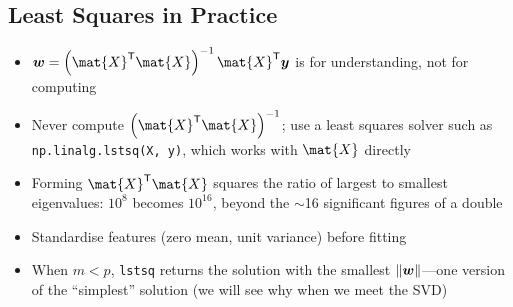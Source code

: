 
\begin{slide}
\section[-1]{Least Squares in Practice}

\begin{PauseHighLight}
  \begin{itemize}
  \item $\bm{w} = \left(\mat{X}^\tr\mat{X}\right)^{-1} \mat{X}^\tr
    \bm{y}$ is for understanding, not for computing\pause
  \item Never compute $\left(\mat{X}^\tr\mat{X}\right)^{-1}$; use a
    least squares solver such as \texttt{np.linalg.lstsq(X, y)}, which
    works with $\mat{X}$ directly\pause
  \item Forming $\mat{X}^\tr\mat{X}$ squares the ratio of largest to
    smallest eigenvalues: $10^8$ becomes $10^{16}$, beyond the
    $\sim$16 significant figures of a double\pause
  \item Standardise features (zero mean, unit variance) before
    fitting\pause
  \item When $m<p$, \texttt{lstsq} returns the solution with the
    smallest $\| \bm{w} \|$---one version of the ``simplest''
    solution (we will see why when we meet the SVD)\pause
  \end{itemize}
\end{PauseHighLight}

\end{slide}


